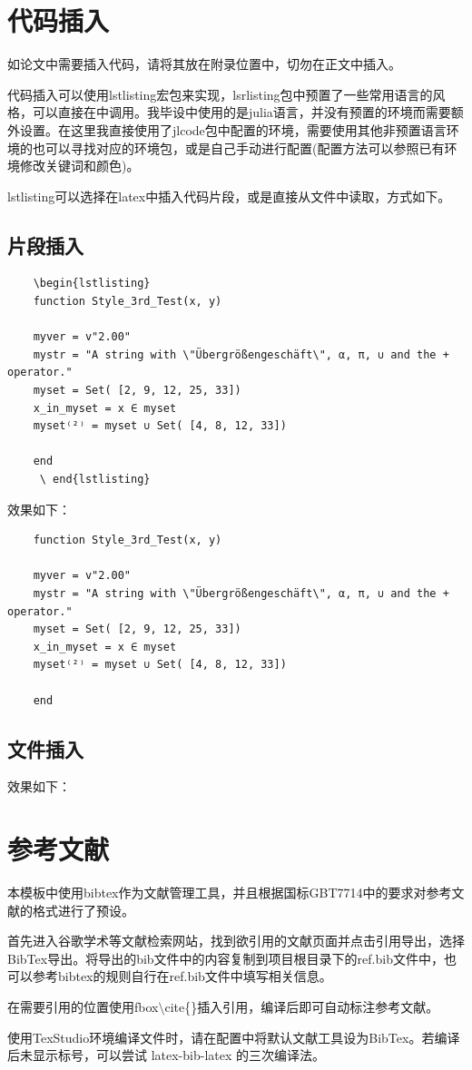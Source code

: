 \begin{spacing}{1.5}
	\section{代码插入}
	如论文中需要插入代码，请将其放在附录位置中，切勿在正文中插入。
	
	代码插入可以使用lstlisting宏包来实现，lsrlisting包中预置了一些常用语言的风格，可以直接在中调用。我毕设中使用的是julia语言，并没有预置的环境而需要额外设置。在这里我直接使用了jlcode包中配置的环境，需要使用其他非预置语言环境的也可以寻找对应的环境包，或是自己手动进行配置(配置方法可以参照已有环境修改关键词和颜色)。
		
	lstlisting可以选择在latex中插入代码片段，或是直接从文件中读取，方式如下。
	
	\subsection{片段插入}
	\begin{lstlisting}
	\begin{lstlisting}
	function Style_3rd_Test(x, y)
	
	myver = v"2.00"
	mystr = "A string with \"Übergrößengeschäft\", α, π, ∪ and the + operator."
	myset = Set( [2, 9, 12, 25, 33])
	x_in_myset = x ∈ myset
	myset⁽²⁾ = myset ∪ Set( [4, 8, 12, 33])
	
	end
	 \ end{lstlisting}
	\end{lstlisting}
	效果如下：
	\begin{lstlisting}
	function Style_3rd_Test(x, y)
	
	myver = v"2.00"
	mystr = "A string with \"Übergrößengeschäft\", α, π, ∪ and the + operator."
	myset = Set( [2, 9, 12, 25, 33])
	x_in_myset = x ∈ myset
	myset⁽²⁾ = myset ∪ Set( [4, 8, 12, 33])
	
	end
	\end{lstlisting}
	
	\subsection{文件插入}
	
	
	效果如下：
	
	
	\section{参考文献}
	本模板中使用bibtex作为文献管理工具，并且根据国标GBT7714中的要求对参考文献的格式进行了预设。
	
	首先进入谷歌学术等文献检索网站，找到欲引用的文献页面并点击引用导出，选择BibTex导出。将导出的bib文件中的内容复制到项目根目录下的ref.bib文件中，也可以参考bibtex的规则自行在ref.bib文件中填写相关信息。
	
	在需要引用的位置使用fbox{$\setminus$cite\{\}}插入引用，编译后即可自动标注参考文献。
	
	使用TexStudio环境编译文件时，请在配置中将默认文献工具设为BibTex。若编译后未显示标号，可以尝试 latex-bib-latex 的三次编译法。
	
\end{spacing}